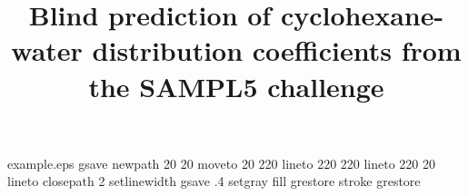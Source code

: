 %
%
%
%
%
\begin{filecontents*}{example.eps}
gsave
newpath
  20 20 moveto
  20 220 lineto
  220 220 lineto
  220 20 lineto
closepath
2 setlinewidth
gsave
  .4 setgray fill
grestore
stroke
grestore
\end{filecontents*}
%
\RequirePackage{fix-cm}
%
\documentclass[smallextended]{svjour3}       %
%
\smartqed  %
%
\usepackage{graphicx}
\usepackage[colorinlistoftodos]{todonotes}
\newcommand{\Dtodo}{\todo[inline, color=red!50!]}
\newcommand{\Ctodo}{\todo[inline, color=blue!50!]}

\newcommand{\comment}[2][]{%
\refstepcounter{comment}%
{%
\todo[inline, color={red!50},size=\small]{%
\textbf{\footnotesize [\uppercase{#1}\thecomment]:}~#2}%
}}



\title{Blind prediction of cyclohexane-water distribution coefficients from the SAMPL5 challenge}
\thanks{We appreciate financial support from the National Institutes of Health (1R01GM108889-01) and the National Science Foundation (CHE 1352608), and computing support from the UCI GreenPlanet cluster, supported in part by NSF Grant CHE-0840513. 
This work was made possible in part by NIH grant U01 GM111528. The contents of this paper are solely the responsibility of the authors and do not necessarily represent the official views of the NIH.
M.K.G. has an equity interest in and is a cofounder and scientiÞc advisor of VeraChem LLC. } %

